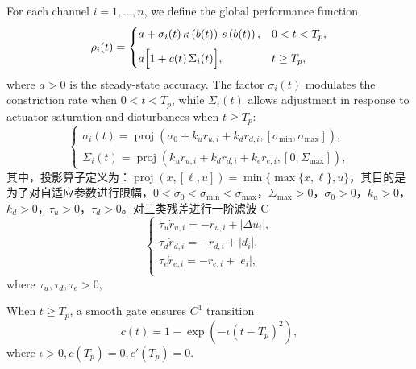 \documentclass[pdflatex,sn-mathphys-num]{sn-jnl}%
\theoremstyle{thmstyleone}%
\theoremstyle{thmstyletwo}%
\theoremstyle{thmstylethree}%
\begin{document}
For each channel $i=1,\dots,n$, we define the global performance function
\begin{equation}\label{eq:gppf-def}
\rho_i(t)=
\begin{cases}
\displaystyle a + \sigma_i(t)\,\kappa\left(b(t)\right)\,s\left(b(t)\right), & 0<t<T_p,\\[6pt]
\displaystyle a\Bigl[1 + c(t)\,\Sigma_i(t)\Bigr], & t\ge T_p,
\end{cases}
\end{equation}
where $a>0$ is the steady-state accuracy. The factor $\sigma_i(t)$ modulates the constriction rate when $0<t<T_p$, while $\Sigma_i(t)$ allows adjustment in response to actuator saturation and disturbances when $t \geq T_p $:
\begin{equation}\label{eq:gppf-def}
	\begin{cases}
\sigma_i(t) = \operatorname{proj}\left( \sigma_0 + k_u r_{u,i} + k_d r_{d,i}, \left[ \sigma_{\min}, \sigma_{\max} \right] \right), \\
\Sigma_i(t) = \operatorname{proj}\left( k_u r_{u,i} + k_d r_{d,i} + k_e r_{e,i}, \left[ 0, \Sigma_{\max} \right] \right),
\end{cases}
\end{equation}
其中，投影算子定义为：$\operatorname*{proj}(x,[\ell, u]) = \min\{\max\{x, \ell\}, u\}$，其目的是为了对自适应参数进行限幅，$0<\sigma_0<\sigma_{\min}<\sigma_{\max}$，$\Sigma_{\max}>0$，$\sigma_{0}>0$，$k_u>0$，$k_d>0$，$\tau_u>0$，$\tau_d>0$。对三类残差进行一阶滤波
C
\begin{equation}\label{eq:gppf-def}
	\begin{cases}
\tau_u \dot{r}_{u,i} = -r_{u,i} + \left| \Delta u_i \right|, \\
\tau_d \dot{r}_{d,i} = -r_{d,i} + \left| d_i \right|, \\
\tau_e \dot{r}_{e,i} = -r_{e,i} + \left| e_i \right|, \\
\end{cases}
\end{equation}
where $\tau_u, \tau_d, \tau_e > 0$,

When $t \geq T_p $, a smooth gate ensures $C^1$ transition
\begin{equation}\label{eq:gppf-gate}
c(t)=1-\exp\!\left(-\iota (t-T_p)^2\right),
\end{equation}      
where $\iota>0, c(T_p)=0, c'(T_p)=0$. 
\end{document}
